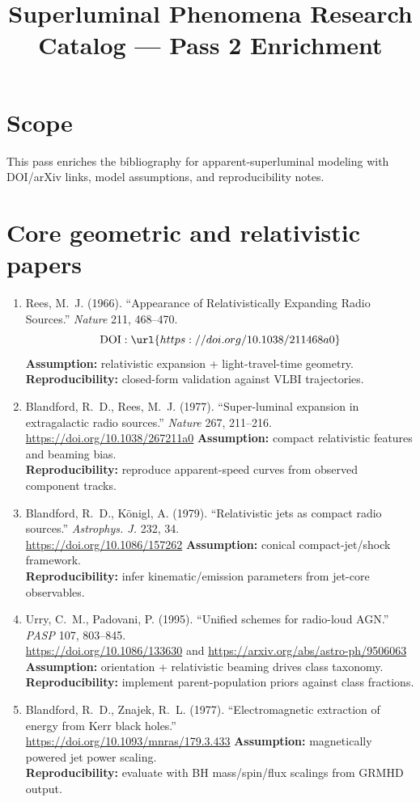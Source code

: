 \documentclass[11pt]{article}
\begin{document}
\title{Superluminal Phenomena Research Catalog --- Pass 2 Enrichment}
\date{}
\maketitle

\section*{Scope}
This pass enriches the bibliography for apparent-superluminal modeling with DOI/arXiv links, model assumptions, and reproducibility notes.

\section{Core geometric and relativistic papers}
\begin{enumerate}
\item Rees, M.~J. (1966). ``Appearance of Relativistically Expanding Radio Sources.'' \emph{Nature} 211, 468--470.
\[\mathrm{DOI:}\;\url{https://doi.org/10.1038/211468a0}\]
\textbf{Assumption:} relativistic expansion + light-travel-time geometry.\\
\textbf{Reproducibility:} closed-form validation against VLBI trajectories.

\item Blandford, R.~D., Rees, M.~J. (1977). ``Super-luminal expansion in extragalactic radio sources.'' \emph{Nature} 267, 211--216.\\
\url{https://doi.org/10.1038/267211a0}
\textbf{Assumption:} compact relativistic features and beaming bias.\\
\textbf{Reproducibility:} reproduce apparent-speed curves from observed component tracks.

\item Blandford, R.~D., K\"onigl, A. (1979). ``Relativistic jets as compact radio sources.'' \emph{Astrophys. J.} 232, 34.\\
\url{https://doi.org/10.1086/157262}
\textbf{Assumption:} conical compact-jet/shock framework.\\
\textbf{Reproducibility:} infer kinematic/emission parameters from jet-core observables.

\item Urry, C.~M., Padovani, P. (1995). ``Unified schemes for radio-loud AGN.'' \emph{PASP} 107, 803--845.\\
\url{https://doi.org/10.1086/133630} and \url{https://arxiv.org/abs/astro-ph/9506063}
\textbf{Assumption:} orientation + relativistic beaming drives class taxonomy.\\
\textbf{Reproducibility:} implement parent-population priors against class fractions.

\item Blandford, R.~D., Znajek, R.~L. (1977). ``Electromagnetic extraction of energy from Kerr black holes.''\\
\url{https://doi.org/10.1093/mnras/179.3.433}
\textbf{Assumption:} magnetically powered jet power scaling.\\
\textbf{Reproducibility:} evaluate with BH mass/spin/flux scalings from GRMHD output.
\end{enumerate}
\end{document}
